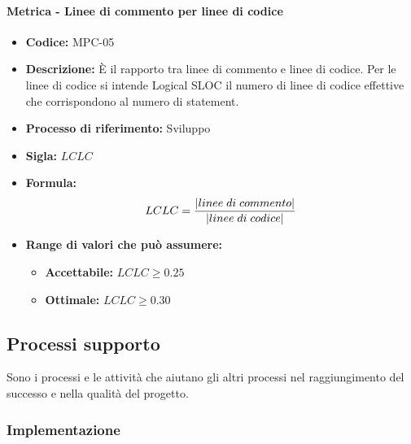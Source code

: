     \paragraph{Metrica - Linee di commento per linee di codice}
    \begin{itemize}
        \item \textbf{Codice:} MPC-05
        \item \textbf{Descrizione:} È il rapporto tra linee di commento e linee di codice. Per le linee di codice si intende Logical SLOC il numero di linee di codice effettive che corrispondono al numero di statement.
        \item \textbf{Processo di riferimento:} Sviluppo
        \item \textbf{Sigla:} $LCLC$
        \item \textbf{Formula:}$$LCLC = {|linee \; di \; commento| \over |linee \; di \; codice|}$$
        \item \textbf{Range di valori che può assumere:}
        \begin{itemize}
            \item \textbf{Accettabile:} $LCLC \geq 0.25$
            \item \textbf{Ottimale:} $LCLC \geq 0.30$
        \end{itemize}
    \end{itemize}

\subsection{Processi supporto}
Sono i processi e le attività che aiutano gli altri processi nel raggiungimento del successo e nella qualità del progetto.
  
\subsubsection{Implementazione}
